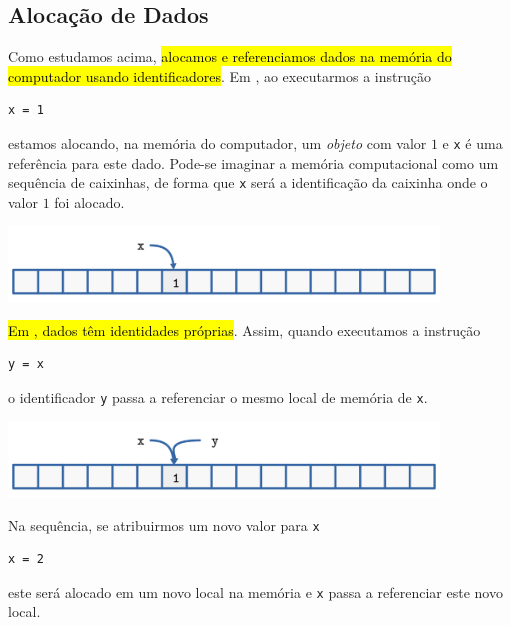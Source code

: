 \subsection{Alocação de Dados}

Como estudamos acima, \hl{alocamos e referenciamos dados na memória do computador usando identificadores}. Em {\python}, ao executarmos a instrução

\begin{lstlisting}
x = 1
\end{lstlisting}

estamos alocando, na memória do computador, um \emph{objeto} com valor $1$ e \texttt{x} é uma referência para este dado. Pode-se imaginar a memória computacional como um sequência de caixinhas, de forma que \lstinline+x+ será a identificação da caixinha onde o valor $1$ foi alocado.

\begin{center}
  \includegraphics[width=4.5in]{./cap_lingua/dados/fig_aloc_mem/xRecebe1.png}
\end{center}

\hl{Em {\python}, dados têm identidades próprias}. Assim, quando executamos a instrução

\begin{lstlisting}
y = x 
\end{lstlisting}

o identificador \lstinline+y+ passa a referenciar o mesmo local de memória de \lstinline+x+.

\begin{center}
  \includegraphics[width=4.5in]{./cap_lingua/dados/fig_aloc_mem/yRecebex.png}
\end{center}

Na sequência, se atribuirmos um novo valor para \lstinline+x+

\begin{lstlisting}
x = 2
\end{lstlisting}

este será alocado em um novo local na memória e \lstinline+x+ passa a referenciar este novo local.

